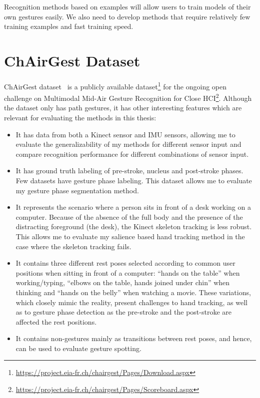 Recognition methods based on examples will allow users to train models of their
own gestures easily. We also need to develop methods that
require relatively few training examples and fast training speed.

\section{ChAirGest Dataset}
ChAirGest dataset~\cite{Ruffieux2013} is a publicly available
dataset\footnote{\url{https://project.eia-fr.ch/chairgest/Pages/Download.aspx}}
for the ongoing open challenge on Multimodal Mid-Air Gesture Recognition for
Close
HCI\footnote{\url{https://project.eia-fr.ch/chairgest/Pages/Scoreboard.aspx}}.
Although the dataset only has path gestures, it has other interesting features
which are relevant for evaluating the methods in this thesis:
\begin{itemize}
  \item It has data from both a Kinect sensor and IMU sensors, allowing me to
  evaluate the generalizability of my methods for different sensor input and
  compare recognition performance for different combinations of sensor input. 
  \item It has ground truth labeling of
  pre-stroke, nucleus and post-stroke phases. Few datasets have gesture phase
  labeling. This dataset allows me to evaluate my gesture phase segmentation method.
  \item It represents the scenario where a person sits in front of a
  desk working on a computer. Because of the absence of the full body and the
  presence of the distracting foreground (the desk), the Kinect skeleton
  tracking is less robust. This allows me to evaluate my salience based hand
  tracking method in the case where the skeleton tracking fails.
  \item It contains three different rest poses selected according to common user
  positions when sitting in front of a computer: ``hands on the table'' when
  working/typing, ``elbows on the table, hands joined under chin'' when thinking
  and ``hands on the belly'' when watching a movie. These variations, which
  closely mimic the reality, present challenges to hand tracking, as well as to
  gesture phase detection as the pre-stroke and the post-stroke are
  affected the rest positions.
  \item It contains non-gestures mainly as transitions between rest poses, and
  hence, can be used to evaluate gesture spotting.
\end{itemize}

